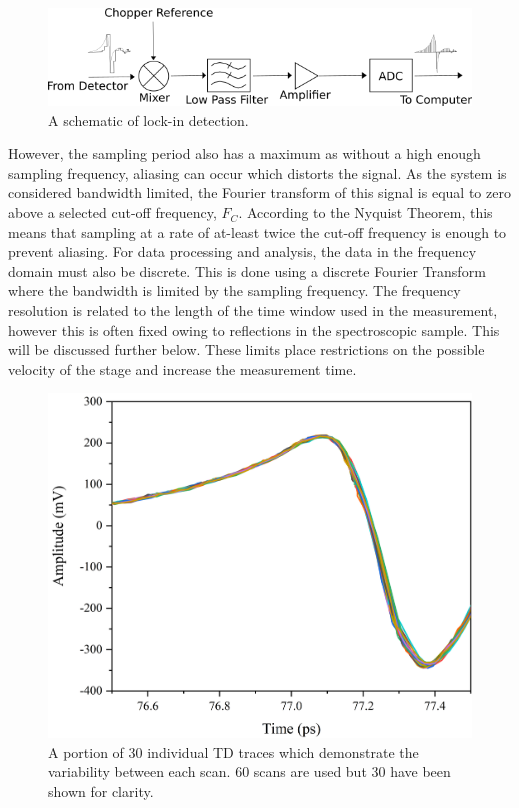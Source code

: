 \begin{figure}
    \centering
    \includegraphics[scale=0.9]{Figures/Misc/Theory/LockInProcess.png}
    \captionsetup{font = footnotesize, justification = centering}
    \caption{A schematic of lock-in detection.}
    \label{fig:lockinDetection}
\end{figure}

However, the sampling period also has a maximum as without a high enough sampling frequency, aliasing can occur which distorts the signal. As the system is considered bandwidth limited, the Fourier transform of this signal is equal to zero above a selected cut-off frequency, \(F_C\). According to the Nyquist Theorem, this means that sampling at a rate of at-least twice the cut-off frequency is enough to prevent aliasing. For data processing and analysis, the data in the frequency domain must also be discrete. This is done using a discrete Fourier Transform where the bandwidth is limited by the sampling frequency. The frequency resolution is related to the length of the time window used in the measurement, however this is often fixed owing to reflections in the spectroscopic sample. This will be discussed further below. These limits place restrictions on the possible velocity of the stage and increase the measurement time.


\begin{figure}
    \centering
    \includegraphics[scale=0.6]{Figures/Misc/Theory/AveragesG.png}
    \captionsetup{font = footnotesize, justification = centering}
    \caption{A portion of 30 individual TD traces which demonstrate the variability between each scan. 60 scans are used but 30 have been shown for clarity.}
    \label{fig:whitenoise}
\end{figure}

